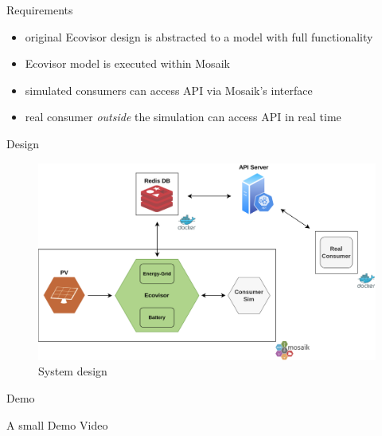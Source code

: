 \begin{frame}{Requirements}
    \begin{center}
        \begin{minipage}{.5\textwidth}
            \begin{itemize}
                \item original Ecovisor design is abstracted to a model with
                    full functionality
                \item Ecovisor model is executed within Mosaik
                \item simulated consumers can access API via Mosaik's interface
                \item real consumer \emph{outside} the simulation can access API
                    in real time
            \end{itemize}
        \end{minipage}
    \end{center}
\end{frame}

\begin{frame}{Design}
    \begin{figure}
    \centering
    \includegraphics[height=.68\textheight]{../../system_design}
    \caption{System design}
    \label{fig:system_design}
    \end{figure}
\end{frame}

\begin{frame}{Demo}
    \begin{center}
        A small Demo Video
    \end{center}
\end{frame}
